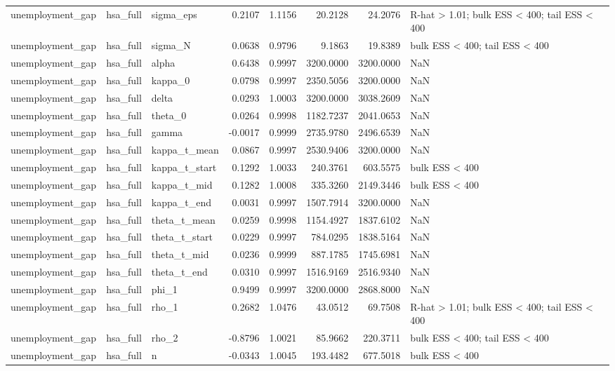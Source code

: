\begin{tabular}{lllrrrrl}
unemployment\_gap & hsa\_full & sigma\_eps & 0.2107 & 1.1156 & 20.2128 & 24.2076 & R-hat > 1.01; bulk ESS < 400; tail ESS < 400 \\
unemployment\_gap & hsa\_full & sigma\_N & 0.0638 & 0.9796 & 9.1863 & 19.8389 & bulk ESS < 400; tail ESS < 400 \\
unemployment\_gap & hsa\_full & alpha & 0.6438 & 0.9997 & 3200.0000 & 3200.0000 & NaN \\
unemployment\_gap & hsa\_full & kappa\_0 & 0.0798 & 0.9997 & 2350.5056 & 3200.0000 & NaN \\
unemployment\_gap & hsa\_full & delta & 0.0293 & 1.0003 & 3200.0000 & 3038.2609 & NaN \\
unemployment\_gap & hsa\_full & theta\_0 & 0.0264 & 0.9998 & 1182.7237 & 2041.0653 & NaN \\
unemployment\_gap & hsa\_full & gamma & -0.0017 & 0.9999 & 2735.9780 & 2496.6539 & NaN \\
unemployment\_gap & hsa\_full & kappa\_t\_mean & 0.0867 & 0.9997 & 2530.9406 & 3200.0000 & NaN \\
unemployment\_gap & hsa\_full & kappa\_t\_start & 0.1292 & 1.0033 & 240.3761 & 603.5575 & bulk ESS < 400 \\
unemployment\_gap & hsa\_full & kappa\_t\_mid & 0.1282 & 1.0008 & 335.3260 & 2149.3446 & bulk ESS < 400 \\
unemployment\_gap & hsa\_full & kappa\_t\_end & 0.0031 & 0.9997 & 1507.7914 & 3200.0000 & NaN \\
unemployment\_gap & hsa\_full & theta\_t\_mean & 0.0259 & 0.9998 & 1154.4927 & 1837.6102 & NaN \\
unemployment\_gap & hsa\_full & theta\_t\_start & 0.0229 & 0.9997 & 784.0295 & 1838.5164 & NaN \\
unemployment\_gap & hsa\_full & theta\_t\_mid & 0.0236 & 0.9999 & 887.1785 & 1745.6981 & NaN \\
unemployment\_gap & hsa\_full & theta\_t\_end & 0.0310 & 0.9997 & 1516.9169 & 2516.9340 & NaN \\
unemployment\_gap & hsa\_full & phi\_1 & 0.9499 & 0.9997 & 3200.0000 & 2868.8000 & NaN \\
unemployment\_gap & hsa\_full & rho\_1 & 0.2682 & 1.0476 & 43.0512 & 69.7508 & R-hat > 1.01; bulk ESS < 400; tail ESS < 400 \\
unemployment\_gap & hsa\_full & rho\_2 & -0.8796 & 1.0021 & 85.9662 & 220.3711 & bulk ESS < 400; tail ESS < 400 \\
unemployment\_gap & hsa\_full & n & -0.0343 & 1.0045 & 193.4482 & 677.5018 & bulk ESS < 400 \\

\end{tabular}
